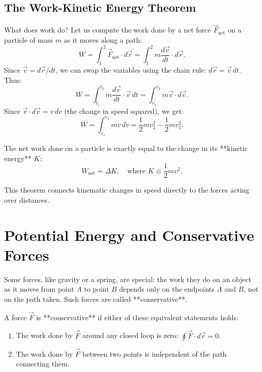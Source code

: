 \subsection{The Work-Kinetic Energy Theorem}

What does work do? Let us compute the work done by a net force $\vec{F}_{\text{net}}$ on a particle of mass $m$ as it moves along a path:
\begin{equation}
    W = \int_{1}^{2} \vec{F}_{\text{net}} \cdot d\vec{r} = \int_{1}^{2} m \frac{d\vec{v}}{dt} \cdot d\vec{r}.
\end{equation}
Since $\vec{v} = d\vec{r}/dt$, we can swap the variables using the chain rule: $d\vec{r} = \vec{v}\,dt$. Thus:
\begin{equation}
    W = \int_{t_1}^{t_2} m \frac{d\vec{v}}{dt} \cdot \vec{v}\,dt = \int_{v_1}^{v_2} m \vec{v} \cdot d\vec{v}.
\end{equation}
Since $\vec{v} \cdot d\vec{v} = v\,dv$ (the change in speed squared), we get:
\begin{equation}
    W = \int_{v_1}^{v_2} m v\,dv = \frac{1}{2}m v_2^2 - \frac{1}{2}m v_1^2.
\end{equation}

\begin{keybox}
The net work done on a particle is exactly equal to the change in its **kinetic energy** $K$:
\begin{equation}
    W_{\text{net}} = \Delta K, \quad \text{where } K \equiv \frac{1}{2}m v^2.
\end{equation}
\end{keybox}

This theorem connects kinematic changes in speed directly to the forces acting over distances.

\section{Potential Energy and Conservative Forces}

Some forces, like gravity or a spring, are special: the work they do on an object as it moves from point $A$ to point $B$ depends only on the endpoints $A$ and $B$, not on the path taken. Such forces are called **conservative**.

\begin{keybox}
A force $\vec{F}$ is **conservative** if either of these equivalent statements holds:
\begin{enumerate}
  \item The work done by $\vec{F}$ around any closed loop is zero: $\oint \vec{F} \cdot d\vec{r} = 0$.
  \item The work done by $\vec{F}$ between two points is independent of the path connecting them.
\end{enumerate}
\end{keybox}

